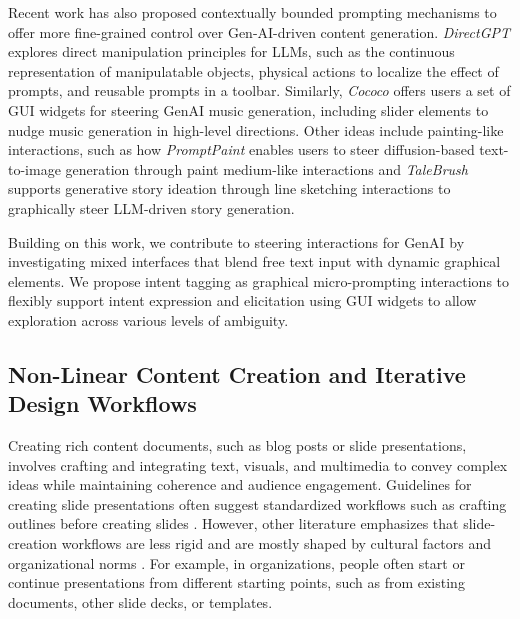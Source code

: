 Recent work has also proposed contextually bounded prompting mechanisms to offer more fine-grained control over Gen-AI-driven content generation. 
\textit{DirectGPT} \cite{masson_directgpt_2024} explores direct manipulation principles for LLMs, such as the continuous representation of manipulatable objects, physical actions to localize the effect of prompts, and reusable prompts in a toolbar.
Similarly, \textit{Cococo} \cite{louie_noviceai_2020} offers users a set of GUI widgets for steering GenAI music generation, including slider elements to nudge music generation in high-level directions.
Other ideas include painting-like interactions, such as how \textit{PromptPaint} \cite{chung_promptpaint_2023} enables users to steer diffusion-based text-to-image generation through paint medium-like interactions and \textit{TaleBrush} \cite{chung_talebrush_2022} supports generative story ideation through line sketching interactions to graphically steer LLM-driven story generation.

Building on this work, we contribute to steering interactions for GenAI by investigating mixed interfaces that blend free text input with dynamic graphical elements.
We propose intent tagging as graphical micro-prompting interactions to flexibly support intent expression and elicitation using GUI widgets to allow exploration across various levels of ambiguity. 


\subsection{Non-Linear Content Creation and Iterative Design Workflows}
Creating rich content documents, such as blog posts or slide presentations, involves crafting and integrating text, visuals, and multimedia to convey complex ideas while maintaining coherence and audience engagement.
Guidelines for creating slide presentations often suggest standardized workflows such as crafting outlines before creating slides \cite{reynolds_presentation_2020,zanders_presentation_2018, anholt_dazzle_2006}. 
However, other literature emphasizes that slide-creation workflows are less rigid and are mostly shaped by cultural factors and organizational norms \cite{yates_powerpoint_2007}. 
For example, in organizations, people often start or continue presentations from different starting points, such as from existing documents, other slide decks, or templates. 

